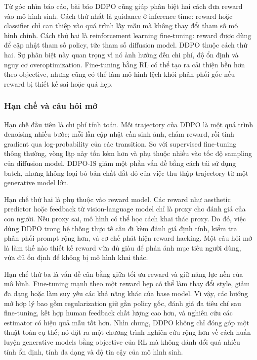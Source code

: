 Từ góc nhìn báo cáo, bài báo DDPO cũng giúp phân biệt hai cách đưa reward vào mô hình sinh.
Cách thứ nhất là guidance ở inference time: reward hoặc classifier chỉ can thiệp vào quá trình lấy mẫu mà không thay đổi tham số mô hình chính.
Cách thứ hai là reinforcement learning fine-tuning: reward được dùng để cập nhật tham số policy, tức tham số diffusion model.
DDPO thuộc cách thứ hai.
Sự phân biệt này quan trọng vì nó ảnh hưởng đến chi phí, độ ổn định và nguy cơ overoptimization.
Fine-tuning bằng RL có thể tạo ra cải thiện bền hơn theo objective, nhưng cũng có thể làm mô hình lệch khỏi phân phối gốc nếu reward bị thiết kế sai hoặc quá hẹp.

\subsubsection*{Hạn chế và câu hỏi mở}

Hạn chế đầu tiên là chi phí tính toán.
Mỗi trajectory của DDPO là một quá trình denoising nhiều bước; mỗi lần cập nhật cần sinh ảnh, chấm reward, rồi tính gradient qua log-probability của các transition.
So với supervised fine-tuning thông thường, vòng lặp này tốn kém hơn và phụ thuộc nhiều vào tốc độ sampling của diffusion model.
DDPO-IS giảm một phần vấn đề bằng cách tái sử dụng batch, nhưng không loại bỏ bản chất đắt đỏ của việc thu thập trajectory từ một generative model lớn.

Hạn chế thứ hai là phụ thuộc vào reward model.
Các reward như aesthetic predictor hoặc feedback từ vision-language model chỉ là proxy cho đánh giá của con người.
Nếu proxy sai, mô hình có thể học cách khai thác proxy.
Do đó, việc dùng DDPO trong hệ thống thực tế cần đi kèm đánh giá định tính, kiểm tra phân phối prompt rộng hơn, và cơ chế phát hiện reward hacking.
Một câu hỏi mở là làm thế nào thiết kế reward vừa đủ giàu để phản ánh mục tiêu người dùng, vừa đủ ổn định để không bị mô hình khai thác.

Hạn chế thứ ba là vấn đề cân bằng giữa tối ưu reward và giữ năng lực nền của mô hình.
Fine-tuning mạnh theo một reward hẹp có thể làm thay đổi style, giảm đa dạng hoặc làm suy yếu các khả năng khác của base model.
Vì vậy, các hướng mở hợp lý bao gồm regularization giữ gần policy gốc, đánh giá đa tiêu chí sau fine-tuning, kết hợp human feedback chất lượng cao hơn, và nghiên cứu các estimator có hiệu quả mẫu tốt hơn.
Nhìn chung, DDPO không chỉ đóng góp một thuật toán cụ thể; nó đặt ra một chương trình nghiên cứu rộng hơn về cách huấn luyện generative models bằng objective của RL mà không đánh đổi quá nhiều tính ổn định, tính đa dạng và độ tin cậy của mô hình sinh.

